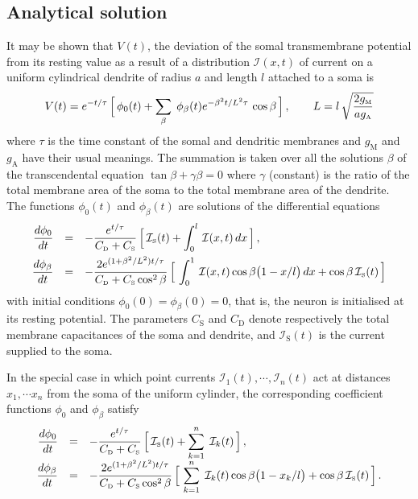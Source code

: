 \subsection{Analytical solution}
It may be shown that $V(t)$, the deviation of the somal
transmembrane potential from its resting value as a result of a
distribution $\mathcal{I}(x,t)$ of current on a uniform
cylindrical dendrite of radius $a$ and length $l$ attached to a
soma is
\begin{equation}\label{es4}
V(t)=e^{-t/\tau}\,\Big[\,\phi_0(t)+\sum_\beta\;\phi_\beta(t)
e^{-\beta^2 t/L^2\tau}\,\cos\beta\,\Big]\,, \qquad
L=l\,\sqrt{\displaystyle\frac{2 g_{\mbox{\tiny M}}}{a g_{\mbox{\tiny A}}}}
\end{equation}
where $\tau$ is the time constant of the somal and dendritic
membranes and $g_\mathrm{M}$ and $g_\mathrm{A}$ have their usual
meanings. The summation is taken over all the solutions $\beta$ of
the transcendental equation $\tan\beta+\gamma\beta=0$ where
$\gamma$ (constant) is the ratio of the total membrane area of the
soma to the total membrane area of the dendrite. The functions
$\phi_0(t)$ and $\phi_\beta(t)$ are solutions of the differential
equations
\begin{equation}\label{es9}
\begin{array}{rcl}
\displaystyle\frac{d\phi_0}{dt} & = & -\displaystyle\frac{e^{t/\tau}}
{C_{\mbox{\tiny D}}+C_{\mbox{\tiny S}}}\,\Big[\,
\mathcal{I}_{\mbox{\tiny S}}(t)+\int_0^l\,\mathcal{I}(x,t)\,dx\,\Big]\,,\\[10pt]
\displaystyle\frac{d\phi_\beta}{dt} & = &
-\displaystyle\frac{2e^{(1+\beta^2/L^2)t/\tau}} {C_{\mbox{\tiny D}}
+C_{\mbox{\tiny S}}\cos^2\beta}\,\Big[\,
\int_0^1\,\mathcal{I}(x,t)\cos\beta\big(1-x/l\big)\,dx
+\cos\beta\,\mathcal{I}_{\mbox{\tiny S}}(t)\,\Big]
\end{array}
\end{equation}
with initial conditions $\phi_0(0)=\phi_\beta(0)=0$, that is, the
neuron is initialised at its resting potential. The parameters
$C_\mathrm{S}$ and $C_\mathrm{D}$ denote respectively the total
membrane capacitances of the soma and dendrite, and
$\mathcal{I}_\mathrm{S}(t)$ is the current supplied to the soma.

In the special case in which point currents $\mathcal{I}_1(t),
\cdots,\mathcal{I}_n(t)$ act at distances $x_1,\cdots x_n$ from
the soma of the uniform cylinder, the corresponding coefficient
functions $\phi_0$ and $\phi_\beta$ satisfy
\begin{equation}\label{ec2}
\begin{array}{rcl}
\displaystyle\frac{d\phi_0}{dt} & = &\displaystyle-\frac{e^{t/\tau}}
{C_{\mbox{\tiny D}}+C_{\mbox{\tiny S}}}\,\Big[\,
\mathcal{I}_{\mbox{\tiny S}}(t)+\sum_{k=1}^n\;\mathcal{I}_k(t)\,\Big]\,,\\[10pt]
\displaystyle\frac{d\phi_\beta}{dt} & = &
\displaystyle-\frac{2e^{(1+\beta^2/L^2)t/\tau}}
{C_{\mbox{\tiny D}}+C_{\mbox{\tiny S}}\cos^2\beta}\,\Big[\, \sum_{k=1}^n
\;\mathcal{I}_k(t)\cos\beta\big(1-x_k/l\big)
+\cos\beta\,\mathcal{I}_{\mbox{\tiny S}}(t)\,\Big]\,.
\end{array}
\end{equation}
